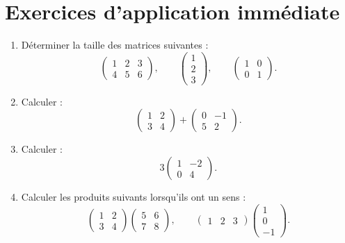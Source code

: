 \documentclass[11pt,a4paper]{article}
\theoremstyle{remark}
\begin{document}
\section*{Exercices d’application immédiate}

\begin{enumerate}[label=\textbf{Exercice \arabic*.}]
    \item Déterminer la taille des matrices suivantes :
    \[
    \begin{pmatrix}
    1 & 2 & 3\\
    4 & 5 & 6
    \end{pmatrix},
    \qquad
    \begin{pmatrix}
    1\\
    2\\
    3
    \end{pmatrix},
    \qquad
    \begin{pmatrix}
    1 & 0\\
    0 & 1
    \end{pmatrix}.
    \]

    \item Calculer :
    \[
    \begin{pmatrix}
    1 & 2\\
    3 & 4
    \end{pmatrix}
    +
    \begin{pmatrix}
    0 & -1\\
    5 & 2
    \end{pmatrix}.
    \]

    \item Calculer :
    \[
    3
    \begin{pmatrix}
    1 & -2\\
    0 & 4
    \end{pmatrix}.
    \]

    \item Calculer les produits suivants lorsqu’ils ont un sens :
    \[
    \begin{pmatrix}
    1 & 2\\
    3 & 4
    \end{pmatrix}
    \begin{pmatrix}
    5 & 6\\
    7 & 8
    \end{pmatrix},
    \qquad
    \begin{pmatrix}
    1 & 2 & 3
    \end{pmatrix}
    \begin{pmatrix}
    1\\
    0\\
    -1
    \end{pmatrix}.
    \]


\end{enumerate}
\end{document}
